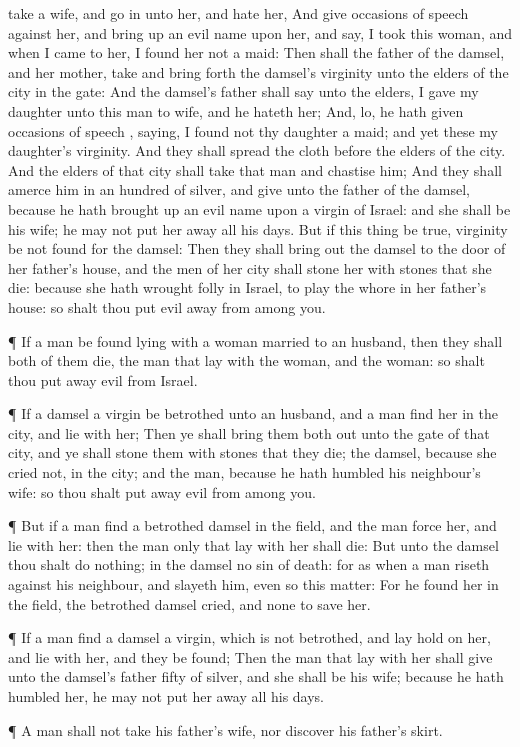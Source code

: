 {take a
wife, and go
in unto her, and
hate her,
And
give
occasions of
speech against her, and bring
up an
evil
name upon her, and
say, I
took this
woman, and when I
came to her, I
found her not a
maid:
Then shall the
father of the
damsel, and her
mother,
take and bring
forth
{} the
damsel’s
virginity unto the
elders of the
city in the
gate:
And the
damsel’s
father shall
say unto the
elders, I
gave my
daughter unto this
man to
wife, and he
hateth her;
And, lo, he hath
given
occasions of
speech
{},
saying, I
found not thy
daughter a
maid; and yet these
{} my
daughter’s
virginity. And they shall
spread the
cloth
before the
elders of the
city.
And the
elders of that
city shall
take that
man and
chastise him;
And they shall
amerce him in an
hundred
{} of
silver, and
give
{} unto the
father of the
damsel, because he hath brought
up an
evil
name upon a
virgin of
Israel: and she shall be his
wife; he
may not put her
away all his
days.
But if this
thing be
true,
{}
virginity be not
found for the
damsel:
Then they shall bring
out the
damsel to the
door of her
father’s
house, and the
men of her
city shall
stone her with
stones that she
die: because she hath
wrought
folly in
Israel, to play the
whore in her
father’s
house: so shalt thou
put
evil
away from
among you.
\par }{\PP {}¶ If a
man be
found
lying with a
woman
married to an
husband, then they shall both of
them
die,
{} the
man that
lay with the
woman, and the
woman: so shalt thou put
away
evil from
Israel.
\par }{\PP {}¶ If a
damsel
{} a
virgin be
betrothed unto an
husband, and a
man
find her in the
city, and
lie with her;
Then ye shall
bring them
both out unto the
gate of that
city, and ye shall
stone them with
stones that they
die; the
damsel,
because she
cried not,
{} in the
city; and the
man,
because he hath
humbled his
neighbour’s
wife: so thou shalt put
away
evil from
among you.
\par }{\PP {}¶ But if a
man
find a
betrothed
damsel in the
field, and the
man
force her, and
lie with her: then the
man only that
lay with her shall
die:
But unto the
damsel thou shalt
do
nothing;
{} in the
damsel no
sin
{} of
death: for as when a
man
riseth against his
neighbour, and
slayeth him, even so
{} this
matter:
For he
found her in the
field,
{} the
betrothed
damsel
cried, and
{} none to
save her.
\par }{\PP {}¶ If a
man
find a
damsel
{} a
virgin, which is not
betrothed, and lay
hold on her, and
lie with her, and they be
found;
Then the
man that
lay with her shall
give unto the
damsel’s
father
fifty
{} of
silver, and she shall be his
wife; because he hath
humbled her, he
may not put her
away all his
days.
\par }{\PP {}¶ A
man shall not
take his
father’s
wife, nor
discover his
father’s
skirt.

}
